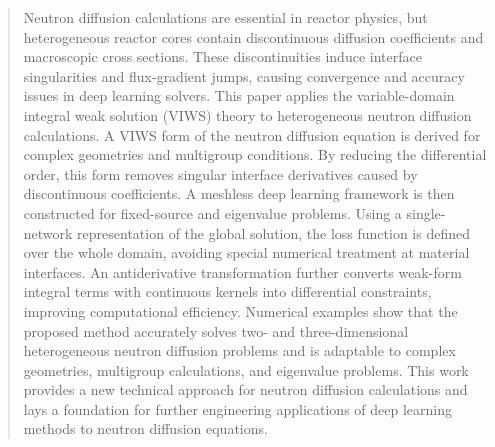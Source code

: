 \documentclass[final,3p,times,sort&compress]{elsarticle}
\begin{document}
\begin{frontmatter}





\begin{abstract}
    Neutron diffusion calculations are essential in reactor physics, but heterogeneous reactor cores contain discontinuous diffusion coefficients and macroscopic cross sections. These discontinuities induce interface singularities and flux-gradient jumps, causing convergence and accuracy issues in deep learning solvers. This paper applies the variable-domain integral weak solution (VIWS) theory to heterogeneous neutron diffusion calculations. A VIWS form of the neutron diffusion equation is derived for complex geometries and multigroup conditions. By reducing the differential order, this form removes singular interface derivatives caused by discontinuous coefficients. A meshless deep learning framework is then constructed for fixed-source and eigenvalue problems. Using a single-network representation of the global solution, the loss function is defined over the whole domain, avoiding special numerical treatment at material interfaces. An antiderivative transformation further converts weak-form integral terms with continuous kernels into differential constraints, improving computational efficiency. Numerical examples show that the proposed method accurately solves two- and three-dimensional heterogeneous neutron diffusion problems and is adaptable to complex geometries, multigroup calculations, and eigenvalue problems. This work provides a new technical approach for neutron diffusion calculations and lays a foundation for further engineering applications of deep learning methods to neutron diffusion equations.
\end{abstract}


\end{frontmatter}
\end{document}
